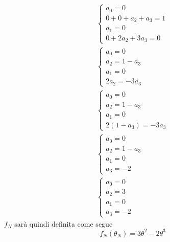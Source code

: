 \documentclass[10pt, letterpaper]{report}
\begin{document}
 \begin{eqnarray}
     \begin{cases}
    a_0=0\\ 
    0+0+a_2+a_3=1\\ 
    a_1=0\\ 
    0+2a_2+3a_3=0
\end{cases}\\ 
\begin{cases}
    a_0=0\\ 
    a_2=1-a_3\\ 
    a_1=0\\ 
    2a_2=-3a_3
\end{cases}\\ 
\begin{cases}
    a_0=0\\ 
    a_2=1-a_3\\ 
    a_1=0\\ 
    2(1-a_3)=-3a_3
\end{cases}\\ 
\begin{cases}
    a_0=0\\ 
    a_2=1-a_3\\ 
    a_1=0\\ 
    a_3=-2
\end{cases}\\ 
\begin{cases}
    a_0=0\\ 
    a_2=3\\ 
    a_1=0\\ 
    a_3=-2
\end{cases}
\end{eqnarray}
$f_N$ sarà quindi definita come segue 
$$ f_N(\theta_N)=3\theta^2-2\theta^3$$
\end{document}
